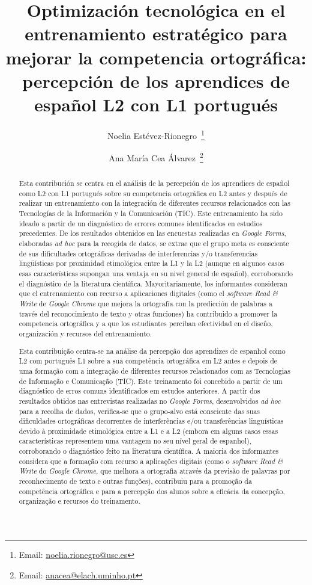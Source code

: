 \documentclass[spanish]{textolivre}
\title{Optimización tecnológica en el entrenamiento estratégico para mejorar la competencia ortográfica: percepción de los aprendices de español L2 con L1 portugués}
\author[1]{Noelia Estévez-Rionegro~\orcid{0000-0002-7828-5339}\thanks{Email: \href{mailto:noelia.rionegro@usc.es}{noelia.rionegro@usc.es}}}
\author[2]{Ana María Cea Álvarez~\orcid{0000-0002-7383-9646}\thanks{Email: \href{mailto:anacea@elach.uminho.pt}{anacea@elach.uminho.pt}}}
\affil[1]{Universidade de Santiago de Compostela, Facultad de Formación del Profesorado, Departamento de Didácticas Aplicadas, Lugo, Galicia, España.}
\affil[2]{Universidade do Minho, Escola de Letras, Artes e Ciências Humanas, Departamento de Estudos Românicos, Campus de Gualtar, Braga, Portugal.}
\begin{document}
\maketitle
\begin{polyabstract}
\begin{abstract}
Esta contribución se centra en el análisis de la percepción de los aprendices de español como L2 con L1 portugués sobre su competencia ortográfica en L2 antes y después de realizar un entrenamiento con la integración de diferentes recursos relacionados con las Tecnologías de la Información y la Comunicación (TIC). Este entrenamiento ha sido ideado a partir de un diagnóstico de errores comunes identificados en estudios precedentes. De los resultados obtenidos en las encuestas realizadas en \textit{Google Forms}, elaboradas \textit{ad hoc} para la recogida de datos, se extrae que el grupo meta es consciente de sus dificultades ortográficas derivadas de interferencias y/o transferencias lingüísticas por proximidad etimológica entre la L1 y la L2 (aunque en algunos casos esas características supongan una ventaja en su nivel general de español), corroborando el diagnóstico de la literatura científica. Mayoritariamente, los informantes consideran que el entrenamiento con recurso a aplicaciones digitales (como el \textit{software Read \& Write} de \textit{Google Chrome} que mejora la ortografía con la predicción de palabras a través del reconocimiento de texto y otras funciones) ha contribuido a promover la competencia ortográfica y a que los estudiantes perciban efectividad en el diseño, organización y recursos del entrenamiento.

\end{abstract}

\begin{portuguese}
\begin{abstract}
Esta contribuição centra-se na análise da percepção dos aprendizes de espanhol como L2 com português L1 sobre a sua competência ortográfica em L2 antes e depois de uma formação com a integração de diferentes recursos relacionados com as Tecnologias de Informação e Comunicação (TIC). Este treinamento foi concebido a partir de um diagnóstico de erros comuns identificados em estudos anteriores. A partir dos resultados obtidos nas entrevistas realizadas no \textit{Google Forms}, desenvolvidos \textit{ad hoc} para a recolha de dados, verifica-se que o grupo-alvo está consciente das suas dificuldades ortográficas decorrentes de interferências e/ou transferências linguísticas devido à proximidade etimológica entre a L1 e a L2 (embora em alguns casos essas características representem uma vantagem no seu nível geral de espanhol), corroborando o diagnóstico feito na literatura científica. A maioria dos informantes considera que a formação com recurso a aplicações digitais (como o \textit{software} \textit{Read \& Write} do \textit{Google Chrome}, que melhora a ortografia através da previsão de palavras por reconhecimento de texto e outras funções), contribuiu para a promoção da competência ortográfica e para a percepção dos alunos sobre a eficácia da concepção, organização e recursos do treinamento.


\end{abstract}
\end{portuguese}
\end{polyabstract}
\end{document}
